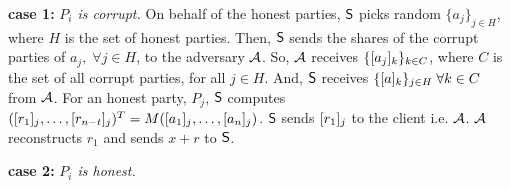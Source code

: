 {\bf case 1:} {\em $P_i$ is corrupt. } On behalf of the honest parties, $\mathsf{S}$ picks random $\{a_j\}_{j\in H}$, where $H$ is the set of honest parties. Then, $\mathsf{S}$ sends the shares of the corrupt parties of $a_j, \; \forall j\in H$, to the adversary $\mathcal{A}$.
So, $\mathcal{A}$ receives $\{[a_j]_k\}_{k\in C}$, where $C$ is the set of all corrupt parties, for all $j\in H$. 
And, $\mathsf{S}$ receives $\{[a]_k\}_{j\in H} \; \forall k\in C$ from $\mathcal{A}$.
For an honest party, $P_j$, $\mathsf{S}$ computes $([r_1]_j,\ldots, [r_{n-t}]_j)^T = M ([a_1]_j, \ldots, [a_n]_j)$. 
$\mathsf{S}$ sends $[r_1]_j$ to the client i.e. $\mathcal{A}$.
$\mathcal{A}$ reconstructs $r_1$ and sends $x+r$ to $\mathsf{S}$.

{\bf case 2:} {\em $P_i$ is honest. }